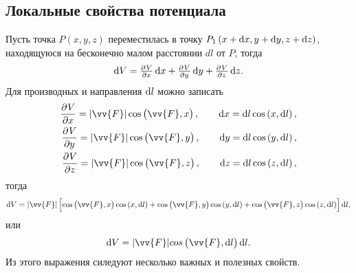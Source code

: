 \documentclass[11pt, a4paper]{article}
\theoremstyle{plain}
\theoremstyle{definition}
\theoremstyle{remark}
\begin{document}
\subsection{Локальные свойства потенциала}
Пусть точка $P\left( x,y,z \right)$ переместилась в точку $P_1\left( x + \dif x, y + \dif y, z +
\dif z \right)$, находящуюся на бесконечно малом расстоянии $dl$ от $P$, тогда
\begin{equation*}
    \dif V = \pd{V}{x}\dif x + \pd{V}{y}\dif y + \pd{V}{z}\dif z.
\end{equation*}
Для производных и направления $\dif l$ можно записать
\begin{align*}
    \dpd{V}{x} = |\vv{F}|\cos\left( \vv{F}, x \right),\qquad \dif x = \dif l\cos\left( x, \dif l
    \right),\\
    \dpd{V}{y} = |\vv{F}|\cos\left( \vv{F}, y \right),\qquad \dif y = \dif l\cos\left( y, \dif l
    \right),\\
    \dpd{V}{z} = |\vv{F}|\cos\left( \vv{F}, z \right),\qquad \dif z = \dif l\cos\left( z, \dif l
    \right),
\end{align*}
тогда
\begin{equation*}
    \dif V = |\vv{F}|\left[
        \cos\left( \vv{F}, x \right)\cos\left( x, \dif l \right) +
        \cos\left( \vv{F}, y \right)\cos\left( y, \dif l \right) +
    \cos\left( \vv{F}, z \right)\cos\left( z, \dif l \right) \right]\dif l,
\end{equation*}
или
\begin{equation*}
    \dif V = |\vv{F}|cos\left( \vv{F}, \dif l \right)\dif l.
\end{equation*}
Из этого выражения силедуют несколько важных и полезных свойств.
\end{document}
